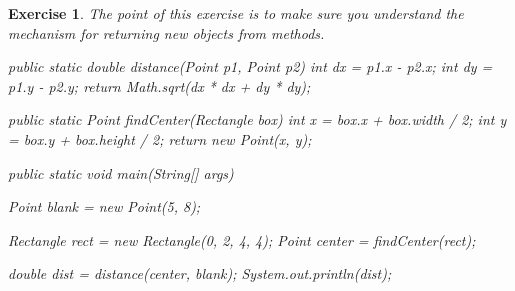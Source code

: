 \documentclass[12pt]{book}
\theoremstyle{exercise}
\newtheorem{exercise}{Exercise}[chapter]
\newcommand{\java}{\verb}%}
\begin{document}
\begin{exercise}
The point of this exercise is to make sure you understand the mechanism for returning new objects from methods.


\begin{code}
public static double distance(Point p1, Point p2) {
    int dx = p1.x - p2.x;
    int dy = p1.y - p2.y;
    return Math.sqrt(dx * dx + dy * dy);
}

public static Point findCenter(Rectangle box) {
    int x = box.x + box.width / 2;
    int y = box.y + box.height / 2;
    return new Point(x, y);
}
\end{code}

\begin{code}
public static void main(String[] args) {
    Point blank = new Point(5, 8);

    Rectangle rect = new Rectangle(0, 2, 4, 4);
    Point center = findCenter(rect);

    double dist = distance(center, blank);
    System.out.println(dist);
}
\end{code}

\end{exercise}
\end{document}
